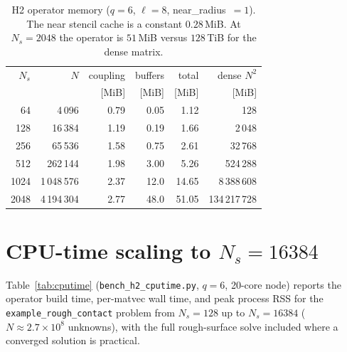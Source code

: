 \documentclass[11pt,a4paper]{article}
\begin{document}
\begin{table}[h]
\centering
\begin{tabular}{rrrrrr}
\toprule
$N_s$ & $N$ & coupling & buffers & total & dense $N^2$ \\
      &     & [MiB]    & [MiB]   & [MiB] & [MiB] \\
\midrule
64   & 4\,096      & 0.79 & 0.05  & 1.12  & 128 \\
128  & 16\,384     & 1.19 & 0.19  & 1.66  & 2\,048 \\
256  & 65\,536     & 1.58 & 0.75  & 2.61  & 32\,768 \\
512  & 262\,144    & 1.98 & 3.00  & 5.26  & 524\,288 \\
1024 & 1\,048\,576 & 2.37 & 12.0  & 14.65 & 8\,388\,608 \\
2048 & 4\,194\,304 & 2.77 & 48.0  & 51.05 & 134\,217\,728 \\
\bottomrule
\end{tabular}
\caption{H2 operator memory ($q=6$, $\ell=8$, near\_radius~$=1$). The near
stencil cache is a constant $0.28$\,MiB. At $N_s=2048$ the operator is
$51$\,MiB versus $128$\,TiB for the dense matrix.}
\label{tab:mem}
\end{table}

\section{CPU-time scaling to $N_s=16384$}

Table~\ref{tab:cputime} (\texttt{bench\_h2\_cputime.py}, $q=6$, 20-core node)
reports the operator build time, per-matvec wall time, and peak process RSS
for the \texttt{example\_rough\_contact} problem from $N_s=128$ up to
$N_s=16384$ ($N\approx2.7\times10^8$ unknowns), with the full rough-surface
solve included where a converged solution is practical.
\end{document}
